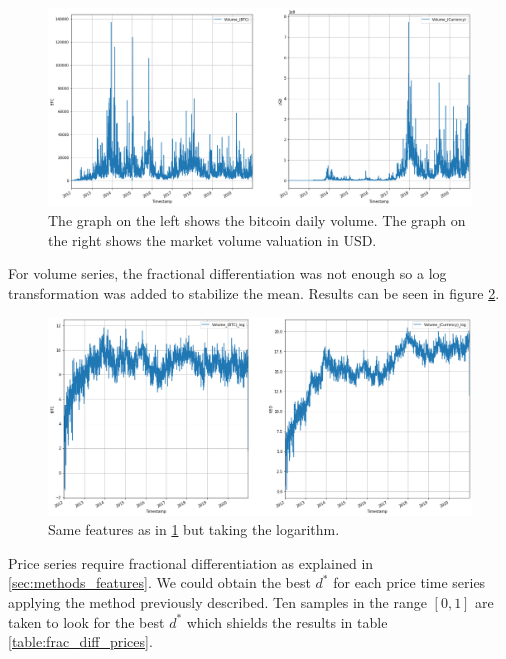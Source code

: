 \begin{figure}[H]
    \centering
    \includegraphics[width=\textwidth]{methods/images/btc_volume.png}
    \caption{The graph on the left shows the bitcoin daily volume. The graph on the right shows the market volume valuation in USD.}
    \label{fig:btc_volume}
\end{figure}

For volume series, the fractional differentiation was not enough so a log transformation
was added to stabilize the mean. Results can be seen in figure \ref{fig:btc_volume_log}.

\begin{figure}[!htb]
    \centering
    \includegraphics[width=\textwidth]{methods/images/btc_volume_log.png}
    \caption{Same features as in \ref{fig:btc_volume} but taking the logarithm.}
    \label{fig:btc_volume_log}
\end{figure}

Price series require fractional differentiation as explained in
\ref{sec:methods_features}. We could obtain the best $d^*$ for each price time
series applying the method previously described. Ten samples in the range
$[0, 1]$ are taken to look for the best $d^*$ which shields the results in table
\ref{table:frac_diff_prices}.


